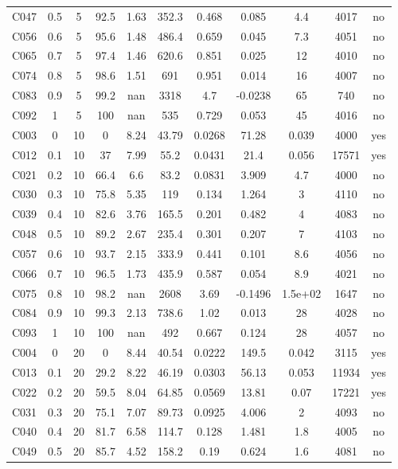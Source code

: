 \begin{longtable}{@{}lcccccccccc@{}}
C047 & 0.5 & 5 & 92.5 & 1.63 & 352.3 & 0.468 & 0.085 & 4.4 & 4017 & no \\
C056 & 0.6 & 5 & 95.6 & 1.48 & 486.4 & 0.659 & 0.045 & 7.3 & 4051 & no \\
C065 & 0.7 & 5 & 97.4 & 1.46 & 620.6 & 0.851 & 0.025 & 12 & 4010 & no \\
C074 & 0.8 & 5 & 98.6 & 1.51 & 691 & 0.951 & 0.014 & 16 & 4007 & no \\
C083 & 0.9 & 5 & 99.2 & nan & 3318 & 4.7 & -0.0238 & 65 & 740 & no \\
C092 & 1 & 5 & 100 & nan & 535 & 0.729 & 0.053 & 45 & 4016 & no \\
C003 & 0 & 10 & 0 & 8.24 & 43.79 & 0.0268 & 71.28 & 0.039 & 4000 & yes \\
C012 & 0.1 & 10 & 37 & 7.99 & 55.2 & 0.0431 & 21.4 & 0.056 & 17571 & yes \\
C021 & 0.2 & 10 & 66.4 & 6.6 & 83.2 & 0.0831 & 3.909 & 4.7 & 4000 & no \\
C030 & 0.3 & 10 & 75.8 & 5.35 & 119 & 0.134 & 1.264 & 3 & 4110 & no \\
C039 & 0.4 & 10 & 82.6 & 3.76 & 165.5 & 0.201 & 0.482 & 4 & 4083 & no \\
C048 & 0.5 & 10 & 89.2 & 2.67 & 235.4 & 0.301 & 0.207 & 7 & 4103 & no \\
C057 & 0.6 & 10 & 93.7 & 2.15 & 333.9 & 0.441 & 0.101 & 8.6 & 4056 & no \\
C066 & 0.7 & 10 & 96.5 & 1.73 & 435.9 & 0.587 & 0.054 & 8.9 & 4021 & no \\
C075 & 0.8 & 10 & 98.2 & nan & 2608 & 3.69 & -0.1496 & 1.5e+02 & 1647 & no \\
C084 & 0.9 & 10 & 99.3 & 2.13 & 738.6 & 1.02 & 0.013 & 28 & 4028 & no \\
C093 & 1 & 10 & 100 & nan & 492 & 0.667 & 0.124 & 28 & 4057 & no \\
C004 & 0 & 20 & 0 & 8.44 & 40.54 & 0.0222 & 149.5 & 0.042 & 3115 & yes \\
C013 & 0.1 & 20 & 29.2 & 8.22 & 46.19 & 0.0303 & 56.13 & 0.053 & 11934 & yes \\
C022 & 0.2 & 20 & 59.5 & 8.04 & 64.85 & 0.0569 & 13.81 & 0.07 & 17221 & yes \\
C031 & 0.3 & 20 & 75.1 & 7.07 & 89.73 & 0.0925 & 4.006 & 2 & 4093 & no \\
C040 & 0.4 & 20 & 81.7 & 6.58 & 114.7 & 0.128 & 1.481 & 1.8 & 4005 & no \\
C049 & 0.5 & 20 & 85.7 & 4.52 & 158.2 & 0.19 & 0.624 & 1.6 & 4081 & no \\

\end{longtable}
